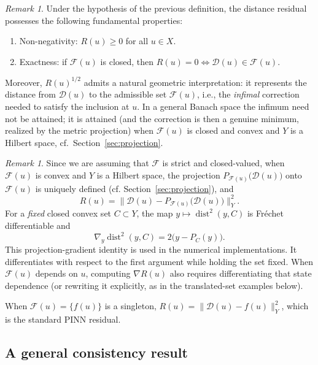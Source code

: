 \documentclass[11pt]{elsarticle}
\theoremstyle{definition}
\theoremstyle{remark}
\newtheorem{remark}[theorem]{Remark}
\numberwithin{equation}{section}
\def\dist{\operatorname{dist}}
\begin{document}
	
	
	\begin{remark}
		Under the hypothesis of the previous definition,
		the distance residual possesses the following fundamental properties:
		\begin{enumerate}
			\item Non-negativity: $R(u)\ge 0$ for all $u\in X$.
			\item Exactness: if $\mathcal{F}(u)$ is closed, then
			$R(u)=0 \iff \mathcal{D}(u)\in\mathcal{F}(u)$.
		\end{enumerate}
		Moreover, $R(u)^{1/2}$ admits a natural geometric interpretation: it represents the distance from $\mathcal{D}(u)$ to the admissible set $\mathcal{F}(u)$, i.e., the \emph{infimal} correction needed to satisfy the inclusion at $u$. In a general Banach space the infimum need not be attained; it is attained (and the correction is then a genuine minimum, realized by the metric projection) when $\mathcal{F}(u)$ is closed and convex and $Y$ is a Hilbert space, cf.\ Section~\ref{sec:projection}.
	\end{remark}
	
	\begin{remark}
		Since we are assuming that $\mathcal{F}$ is strict and closed-valued,
		when $\mathcal{F}(u)$ is convex and $Y$ is a Hilbert space, the
		projection $P_{\mathcal{F}(u)}\bigl(\mathcal{D}(u)\bigr)$ onto $\mathcal{F}(u)$ is uniquely
		defined (cf. Section~\ref{sec:projection}), and
		\[
		R(u)
		=
		\bigl\|\mathcal{D}(u)-P_{\mathcal{F}(u)}\bigl(\mathcal{D}(u)\bigr)\bigr\|_Y^{2}.
		\]
		For a \emph{fixed} closed convex set $C\subset Y$, the map
		$y\mapsto\dist^2(y,C)$ is Fr\'echet differentiable and
		\[
		\nabla_y\dist^2(y,C)=2\bigl(y-P_C(y)\bigr).
		\]
		This projection-gradient identity is used in the numerical
		implementations. It differentiates with respect to the first argument
		while holding the set fixed. When $\mathcal{F}(u)$ depends on $u$,
		computing $\nabla R(u)$ also requires differentiating that state
		dependence (or rewriting it explicitly, as in the translated-set
		examples below).
	\end{remark}
	
	When $\mathcal{F}(u)=\{f(u)\}$ is a singleton,
	$R(u)=\|\mathcal{D}(u)-f(u)\|_Y^2$, which is the standard PINN residual.
	
	\subsection{A general consistency result}
	
\end{document}
